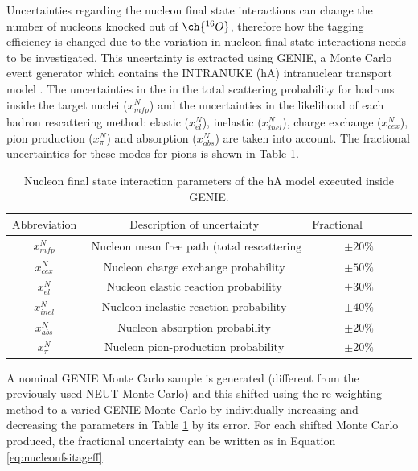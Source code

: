 Uncertainties regarding the nucleon final state interactions can change the number of nucleons knocked out of $\ch{^{16}O}$, therefore how the tagging efficiency is changed due to the variation in nucleon final state interactions needs to be investigated. This uncertainty is extracted using GENIE, a Monte Carlo event generator which contains the INTRANUKE (hA) intranuclear transport model \cite{andreopoulos2010genie}. The uncertainties in the in the total scattering probability for hadrons inside the target nuclei ($x_{m f p}^{N}$) and the uncertainties in the likelihood of each hadron rescattering method: elastic ($x_{e l}^{N}$), inelastic ($x_{i n e l}^{N}$), charge exchange ($x_{c e x}^{N}$), pion production ($x_{\pi}^{N}$) and absorption ($x_{a b s}^{N}$) are taken into account. The fractional uncertainties for these modes for pions is shown in Table \ref{table:nucleonfsiuncertainties}. 

\begin{table}
\begin{tabular}{||ccc||}
\hline
$\text {Abbreviation}$ & $\text { Description of uncertainty }$  & $\text{Fractional uncertainty}$ \\
\hline
$ x_{m f p}^{N}$ & $\text { Nucleon mean free path (total rescattering probability) }$ & $\pm 20 \%$ \\
$x_{c e x}^{N}$ & $\text { Nucleon charge exchange probability }$ & $\pm 50 \%$ \\
$x_{e l}^{N}$ & $\text { Nucleon elastic reaction probability }$ & $\pm 30 \%$ \\
$x_{i n e l}^{N}$ & $\text { Nucleon inelastic reaction probability }$ & $\pm 40 \%$ \\
$x_{a b s}^{N}$ & $\text { Nucleon absorption probability }$ & $\pm 20 \%$ \\
$x_{\pi}^{N}$ & $\text { Nucleon pion-production probability }$ & $\pm 20 \%$\\
\hline
\end{tabular}
\caption{Nucleon final state interaction parameters of the hA model executed inside GENIE.} 
\label{table:nucleonfsiuncertainties}
\end{table}

A nominal GENIE Monte Carlo sample is generated (different from the previously used NEUT Monte Carlo) and this shifted using the re-weighting method to a varied GENIE Monte Carlo by individually increasing and decreasing the parameters in Table \ref{table:nucleonfsiuncertainties} by its error. For each shifted Monte Carlo produced, the fractional uncertainty can be written as in Equation \ref{eq:nucleonfsitageff}.

